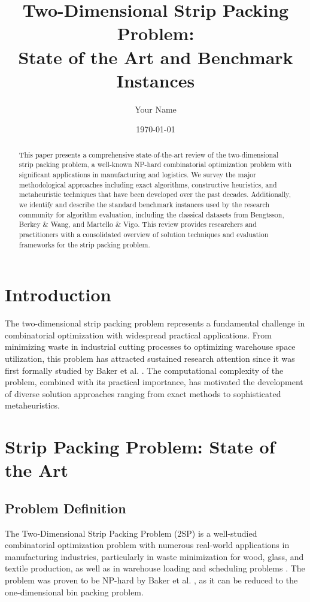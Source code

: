 \documentclass[11pt,a4paper]{article}
\title{\textbf{Two-Dimensional Strip Packing Problem:\\State of the Art and Benchmark Instances}}
\author[1]{Your Name}
\affil[1]{Department/Institution}
\date{\today}
\begin{document}
\maketitle

\begin{abstract}
This paper presents a comprehensive state-of-the-art review of the two-dimensional strip packing problem, a well-known NP-hard combinatorial optimization problem with significant applications in manufacturing and logistics. We survey the major methodological approaches including exact algorithms, constructive heuristics, and metaheuristic techniques that have been developed over the past decades. Additionally, we identify and describe the standard benchmark instances used by the research community for algorithm evaluation, including the classical datasets from Bengtsson, Berkey \& Wang, and Martello \& Vigo. This review provides researchers and practitioners with a consolidated overview of solution techniques and evaluation frameworks for the strip packing problem.
\end{abstract}

\section{Introduction}

The two-dimensional strip packing problem represents a fundamental challenge in combinatorial optimization with widespread practical applications. From minimizing waste in industrial cutting processes to optimizing warehouse space utilization, this problem has attracted sustained research attention since it was first formally studied by Baker et al. \cite{baker1980}. The computational complexity of the problem, combined with its practical importance, has motivated the development of diverse solution approaches ranging from exact methods to sophisticated metaheuristics.

\section{Strip Packing Problem: State of the Art}

\subsection{Problem Definition}

The Two-Dimensional Strip Packing Problem (2SP) is a well-studied combinatorial optimization problem with numerous real-world applications in manufacturing industries, particularly in waste minimization for wood, glass, and textile production, as well as in warehouse loading and scheduling problems \cite{lodi2002,augustine2006}. The problem was proven to be NP-hard by Baker et al. \cite{baker1980}, as it can be reduced to the one-dimensional bin packing problem.
\end{document}
